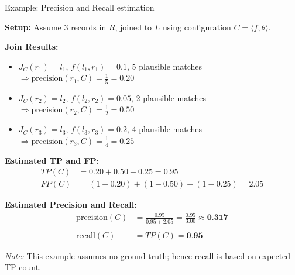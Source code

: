 \documentclass[8pt]{beamer} %
\begin{document}
	
\begin{frame}{Example: Precision and Recall estimation}
	
	\textbf{Setup:} Assume 3 records in $R$, joined to $L$ using configuration $C = \langle f, \theta \rangle$.
	
	\vspace{0.5em}
	\textbf{Join Results:}
	\begin{itemize}
		\item $J_C(r_1) = l_1$, $f(l_1, r_1) = 0.1$, 5 plausible matches $\Rightarrow \text{precision}(r_1, C) = \frac{1}{5} = 0.20$
		\item $J_C(r_2) = l_2$, $f(l_2, r_2) = 0.05$, 2 plausible matches $\Rightarrow \text{precision}(r_2, C) = \frac{1}{2} = 0.50$
		\item $J_C(r_3) = l_3$, $f(l_3, r_3) = 0.2$, 4 plausible matches $\Rightarrow \text{precision}(r_3, C) = \frac{1}{4} = 0.25$
	\end{itemize}
	
	\vspace{0.5em}
	\textbf{Estimated TP and FP:}
	\begin{align*}
		TP(C) &= 0.20 + 0.50 + 0.25 = 0.95 \\
		FP(C) &= (1 - 0.20) + (1 - 0.50) + (1 - 0.25) = 2.05
	\end{align*}

	\vspace{0.5em}
	\textbf{Estimated Precision and Recall:}
	\begin{align*}
		\text{precision}(C) &= \frac{0.95}{0.95 + 2.05} = \frac{0.95}{3.00} \approx \textbf{0.317} \\\\
		\text{recall}(C) &= TP(C) = \textbf{0.95}
	\end{align*}
	
	\vspace{0.5em}
	\textit{Note:} This example assumes no ground truth; hence recall is based on expected TP count.
\end{frame}
\end{document}
